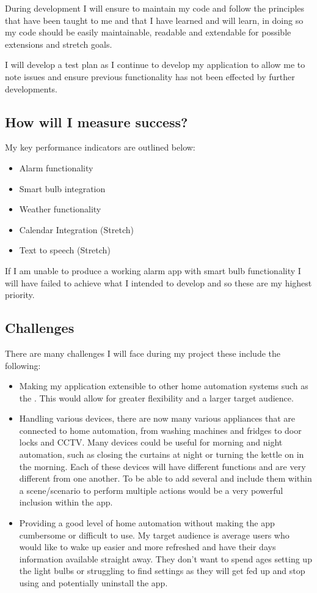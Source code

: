 During development I will ensure to maintain my code and follow the
principles that have been taught to me and that I have learned and will
learn, in doing so my code should be easily maintainable, readable and
extendable for possible extensions and stretch goals.

I will develop a test plan as I continue to develop my application to
allow me to note issues and ensure previous functionality has not been
effected by further developments.

\subsection{How will I measure
success?}\label{how-will-i-measure-success}

My key performance indicators are outlined below:

\begin{itemize}
\tightlist
\item
  Alarm functionality
\item
  Smart bulb integration
\item
  Weather functionality
\item
  Calendar Integration (Stretch)
\item
  Text to speech (Stretch)
\end{itemize}

If I am unable to produce a working alarm app with smart bulb
functionality I will have failed to achieve what I intended to develop
and so these are my highest priority.

\subsection{Challenges}\label{challenges}

There are many challenges I will face during my project these include
the following:

\begin{itemize}
\item
  Making my application extensible to other home automation systems such
  as the \cite{belkinwemo}. This would allow for greater flexibility and
  a larger target audience.
\item
  Handling various devices, there are now many various appliances that
  are connected to home automation, from washing machines and fridges to
  door locks and CCTV. Many devices could be useful for morning and
  night automation, such as closing the curtains at night or turning the
  kettle on in the morning. Each of these devices will have different
  functions and are very different from one another. To be able to add
  several and include them within a scene/scenario to perform multiple
  actions would be a very powerful inclusion within the app.
\item
  Providing a good level of home automation without making the app
  cumbersome or difficult to use. My target audience is average users
  who would like to wake up easier and more refreshed and have their
  days information available straight away. They don't want to spend
  ages setting up the light bulbs or struggling to find settings as they
  will get fed up and stop using and potentially uninstall the app.
\end{itemize}
